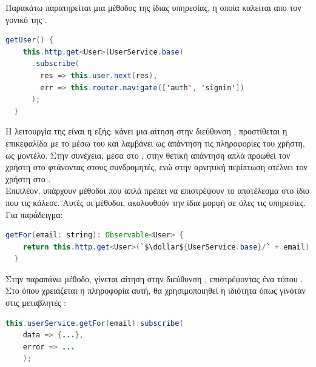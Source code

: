 \pSpace Παρακάτω παρατηρείται μια μέθοδος της ίδιας υπηρεσίας, η οποία καλείται απο τον γονικό  της .\\

	\begin{lstlisting}[language=Java]
getUser() {
    this.http.get<User>(UserService.base)
      .subscribe(
        res => this.user.next(res),
        err => this.router.navigate(['auth', 'signin'])
      );
  }
	\end{lstlisting}

\pSpace Η λειτουργία της είναι η εξής: κάνει μια αίτηση στην διεύθυνση , προστίθεται η επικεφαλίδα με το  μέσω του  και λαμβάνει ως απάντηση τις πληροφορίες του χρήστη, ως  μοντέλο. Στην συνέχεια, μέσα στο , στην θετική απάντηση απλά προωθεί τον χρήστη στο  φτάνοντας στους συνδρομητές, ενώ στην αρνητική περίπτωση στέλνει τον χρήστη στο .\\
\pSpace Επιπλέον, υπάρχουν μέθοδοι που απλά πρέπει να επιστρέψουν το αποτέλεσμα στο ίδιο  που τις κάλεσε. Αυτές οι μέθοδοι, ακολουθούν την ίδια μορφή σε όλες τις υπηρεσίες. Για παράδειγμα:\\

	\begin{lstlisting}[language=Java]
getFor(email: string): Observable<User> {
    return this.http.get<User>(`$\dollar${UserService.base}/` + email);
  }
	\end{lstlisting}
\pSpace Στην παραπάνω μέθοδο, γίνεται αίτηση στην διεύθυνση , επιστρέφοντας ένα  τύπου . Στο  όπου χρειάζεται η πληροφορία αυτή, θα χρησιμοποιηθεί η ιδιότητα  όπως γινόταν στις μεταβλητές :\\
	\begin{lstlisting}[language=Java]
this.userService.getFor(email).subscribe(
	data => {...},
    error => ...
  	);
	\end{lstlisting}
\pagebreak

